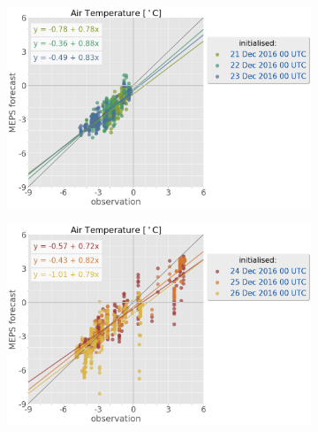 \begin{figure}\ContinuedFloat
	\centering
	\begin{subfigure}[b]{0.49\textwidth}
		\includegraphics[trim={0.cm 0cm 12.5cm 0cm},clip,
		width=\textwidth]{./fig_sfc_temp/obs_model_20161221_23_00}
		\caption{}\label{fig:scat:temp2123}
	\end{subfigure}
	\begin{subfigure}[b]{0.49\textwidth}
		\includegraphics[trim={0.cm 0cm 12.5cm 0cm},clip,
		width=\textwidth]{./fig_sfc_temp/obs_model_20161224_26_00}
		\caption{}\label{fig:scat:temp2426}
	\end{subfigure}
% 	

\end{figure}

